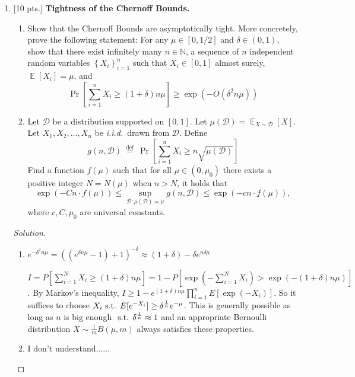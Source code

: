 \documentclass[12pt,letterpaper]{article}
\newenvironment{solution}{%
  \begin{proof}[Solution]$ $\par\nobreak\ignorespaces
}{%
  \end{proof}
}
\DeclareMathOperator*{\E}{\mathbb{E}}
\begin{document}
\begin{enumerate}
\begin{solution}
\begin{enumerate}[label=(\alph*)]
\end{enumerate}
\end{solution}

\item {[10 pts.]} {\bf Tightness of the Chernoff Bounds.}
\begin{enumerate}[label=(\alph*)]
    \item  Show that the Chernoff Bounds are asymptotically tight. More concretely, prove the following statement: For any $\mu \in[0,1 / 2]$ and $\delta \in(0,1)$, show that there exist infinitely many $n \in \mathbb{N}$, a sequence of $n$ independent random variables $\left\{X_{i}\right\}_{i=1}^{n}$ such that $X_{i} \in[0,1]$ almost surely, $\E\left[X_{i}\right]=\mu$, and
$$
\Pr\left[\sum_{i=1}^{n} X_{i} \geq(1+\delta) n \mu\right] \geq \exp (-O(\delta^{2} n \mu))
$$
    \item Let $\mathcal{D}$ be a distribution supported on $[0,1]$. Let $\mu(\mathcal{D})=\E_{X \sim \mathcal{D}}[X] .$ Let $X_{1}, X_{2}, \ldots, X_{n}$ be \emph{i.i.d.}~drawn from $\mathcal{D}$. Define
$$
g(n, \mathcal{D}) \stackrel{\text { def }}{=} \Pr\left[\sum_{i=1}^{n} X_{i} \geq n \sqrt{\mu(\mathcal{D})}\right] 
$$
Find a function $f(\mu)$ such that for all $\mu \in(0, \mu_{0})$ there exists a positive integer $N=N(\mu)$ when $n>N$, it holds that
$$
\exp (-C n \cdot f(\mu)) \leq \sup _{\mathcal{D}: \mu(\mathcal{D})=\mu} g(n, \mathcal{D}) \leq \exp (-c n \cdot f(\mu)),
$$
where $c, C, \mu_{0}$ are universal constants.
\end{enumerate}
\begin{solution}
\begin{enumerate}[label=(\alph*)]
\item
  $e^{-\delta^{2}n\mu}=((e^{\delta n\mu}-1)+1)^{-\delta}\approx (1+\delta)-\delta e^{n\delta \mu}$

  $I=P[\sum_{i=1}^{N}X_{i}\geq (1+\delta)n\mu]=1-P[\exp(-\sum_{i=1}^{N}X_{i})>\exp(-(1+\delta)n\mu)]$. By Markov's inequality, $I\geq 1-e^{(1+\delta)n\mu}\prod_{i=1}^{n}E[\exp(-X_{i})]$. So it suffices to choose $X_{i}\text{ s.t. } E[e^{-X_{i}}]\geq \delta^{\frac 1 n}e^{-\mu}$. This is generally possible as long as $n$ is big enough $\text{ s.t. } \delta^{\frac 1 n}\approx 1$ and an appropriate Bernoulli distribution $X\sim\frac{1}{m}B(\mu,m) $ always satisfies these properties.
\item %

  I don't understand......
\end{enumerate}
\end{solution}


\end{enumerate}
\end{document}

